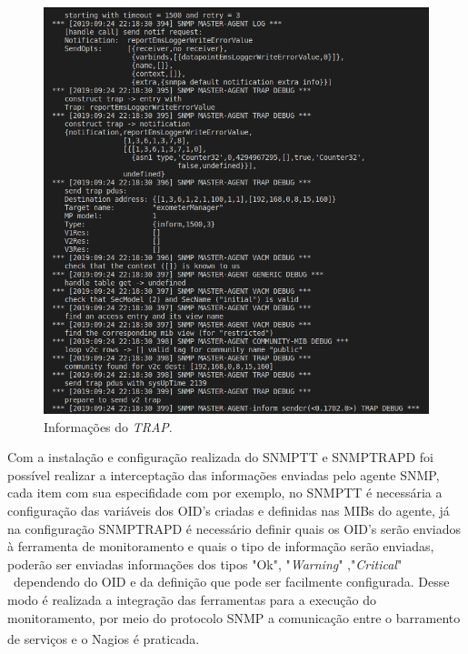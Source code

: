 \begin{figure}[h!]
	\begin{center}
	\includegraphics[scale = 0.70]{img/debugTrap.png}
	\caption{Informações do \textit{TRAP}.}
	\label{fun:fig:debugTrap}
	\end{center}
\end{figure}

Com a instalação e configuração realizada do \acrshort{SNMPTT} e SNMPTRAPD foi possível realizar a interceptação das informações enviadas pelo agente \acrshort{SNMP}, cada item com sua especifidade com por exemplo, no \acrshort{SNMPTT} é necessária a configuração das variáveis dos \acrshort{OID}'s  criadas e definidas nas \acrshort{MIBs} do agente, já na configuração SNMPTRAPD é necessário definir quais os \acrshort{OID}'s serão enviados à ferramenta de monitoramento e quais o tipo de informação serão enviadas, poderão ser enviadas informações dos tipos  "Ok", "\textit{Warning}" ,"\textit{Critical}" \ dependendo do \acrshort{OID} e da definição que pode ser facilmente configurada. Desse modo é realizada a integração das ferramentas para a execução do monitoramento, por meio do protocolo \acrshort{SNMP} a comunicação entre o barramento de serviços e o Nagios\textsuperscript{\textregistered} é praticada.  

